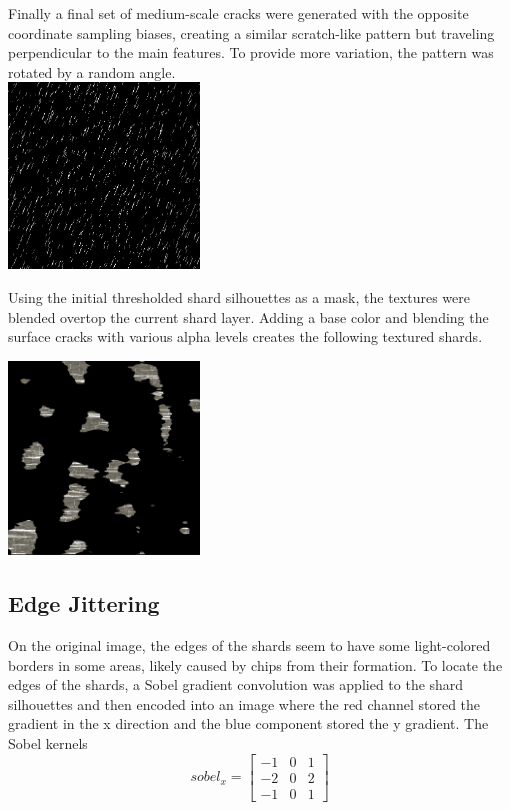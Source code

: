 \documentclass[a4paper, 11pt, titlepage]{article}
\begin{document}
Finally a final set of medium-scale cracks were generated with the opposite coordinate sampling
biases, creating a similar scratch-like pattern but traveling perpendicular to
the main features. To provide more variation, the pattern was rotated by a
random angle.\\

 {
    \includegraphics[width=2.0in]{images/cross-cracks.png}
}

Using the initial thresholded shard silhouettes as a mask, the textures were blended overtop
the current shard layer. Adding a base color and blending the surface cracks
with various alpha levels creates the following textured shards.

 {
    \includegraphics[width=2.0in]{images/textured-shards.png}
}

\subsection{Edge Jittering}
On the original image, the edges of the shards seem to have some light-colored
borders in some areas, likely caused by chips from their formation. To locate
the edges of the shards, a Sobel gradient convolution was applied to the shard
silhouettes and then encoded into an image where the red channel stored the
gradient in the x direction and the blue component stored the y gradient. The
Sobel kernels
\[
\textit{sobel}_x =
\begin{bmatrix}
-1 & 0 & 1 \\
-2 & 0 & 2 \\
-1 & 0 & 1
\end{bmatrix}
\]
\end{document}
